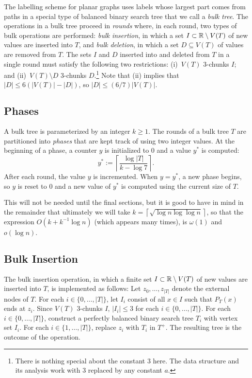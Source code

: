 \documentclass[kpfonts]{patmorin}
\newcommand{\snote}[1]{\fcolorbox{red}{yellow}{#1}}
\let\le\leqslant
\let\ge\geqslant
\begin{document}
The labelling scheme for planar graphs uses labels whose largest part comes from paths in a special type of balanced binary search tree that we call a \emph{bulk tree}.  The operations in a bulk tree proceed in \emph{rounds} where, in each round, two types of bulk operations are performed: \emph{bulk insertion}, in which a set $I\subset \mathbb{R}\setminus V(T)$ of new values are inserted into $T$, and \emph{bulk deletion}, in which a set $D\subseteq V(T)$ of values are removed from $T$. The sets $I$ and $D$ inserted into and deleted from $T$ in a single round must satisfy the following two restrictions: (i)~$V(T)$ $3$-chunks $I$; and (ii)~$V(T)\setminus D$ 3-chunks $D$.\footnote{There is nothing special about the constant $3$ here.  The data structure and its analysis work with $3$ replaced by any constant $a$.}  Note that (ii) implies that $|D|\le 6(|V(T)|-|D|)$, so $|D|\le (6/7)|V(T)|$.

\subsection{Phases}\label{sec:3.1}

A bulk tree is parameterized by an integer $k\ge 1$.  The rounds of a bulk tree $T$ are partitioned into \emph{phases} that are kept track of using two integer values.
At the beginning of a phase, a counter $y$ is initialized to $0$ and a value $y^*$ is computed:
\[  
  y^* := \left\lceil \frac{\log|T|}{k-\log 7}\right\rceil. 
\]
After each round, the value $y$ is incremented.  When $y=y^*$, a new phase begins, so $y$ is reset to 0 and a new value of $y^*$ is computed using the current size of $T$.

\smallskip

This will not be needed until the final sections, but it is good to have in mind in the remainder that ultimately we will take $k=\left\lceil\sqrt{\log n \log \log n}\right\rceil$, so that the expression $O(k+k^{-1}\log n)$ (which appears many times), is $\omega(1)$ and $o(\log n)$.

\subsection{Bulk Insertion}

The bulk insertion operation, in which a finite set $I\subset  \mathbb{R}\setminus V(T)$ of new values are inserted into $T$, is implemented as follows: Let $z_0,\ldots,z_{|T|}$ denote the external nodes of $T$.  For each $i\in\{0,\ldots,|T|\}$, let $I_i$ consist of all $x\in I$ such that $P_T(x)$ ends at $z_i$. 
Since $V(T)$ $3$-chunks $I$, $|I_i|\le 3$ for each $i\in\{0,\ldots,|T|\}$. For each $i\in\{0,\ldots,|T|\}$, construct a perfectly balanced binary search tree $T_i$ with vertex set $I_i$. For each $i\in\{1,\ldots,|T|\}$, replace $z_i$ with $T_i$ in $T^+$. 
The resulting tree is the outcome of the operation. 
\end{document}

